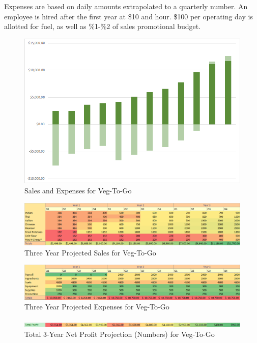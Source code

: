 \documentclass[12pt, letterpaper]{article}
\newcommand{\companyname}{Veg-To-Go}
\begin{document}
Expenses are based on daily amounts extrapolated to a quarterly number. An employee is hired after the first year at \$10 and hour.  \$100 per operating day is allotted for fuel, as well as \%1-\%2 of sales promotional budget.

\begin{figure}[H]
	\caption{Sales and Expenses for \companyname{}}
	\includegraphics[width=\textwidth]{SalesAndExpenses}
\end{figure}

\begin{figure}[H]
	\label{products}
	\caption{Three Year Projected Sales for \companyname{}}
	\includegraphics[width=\textwidth]{SalesNumbers}
\end{figure}

\begin{figure}[H]
	\caption{Three Year Projected Expenses for \companyname{}}
	\includegraphics[width=\textwidth]{ExpensesNumbers}
\end{figure}

\begin{figure}[H]
	\caption{Total 3-Year Net Profit Projection (Numbers) for \companyname{}}
	\includegraphics[width=\textwidth]{TotalProfitNumbers}
\end{figure}
\end{document}
